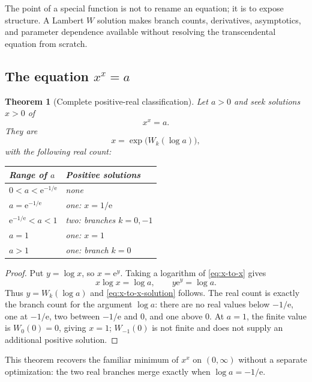 \documentclass[11pt]{article}
\numberwithin{equation}{section}
\newtheorem{theorem}{Theorem}[section]
\theoremstyle{definition}
\theoremstyle{remark}
\newcommand{\e}{\mathrm e}
\begin{document}
The point of a special function is not to rename an equation; it is to expose
structure.  A Lambert $W$ solution makes branch counts, derivatives,
asymptotics, and parameter dependence available without resolving the
transcendental equation from scratch.

\subsection{The equation \texorpdfstring{$x^x=a$}{x to the x = a}}

\begin{theorem}[Complete positive-real classification]
\label{thm:x-to-x}
Let $a>0$ and seek solutions $x>0$ of
\begin{equation}
  x^x=a.                                               \label{eq:x-to-x}
\end{equation}
They are
\begin{equation}
  x=\exp\bigl(W_k(\log a)\bigr),                      \label{eq:x-to-x-solution}
\end{equation}
with the following real count:
\begin{center}
\begin{tabular}{@{}ll@{}}
\toprule
Range of $a$ & Positive solutions \\
\midrule
$0<a<\e^{-1/\e}$ & none \\
$a=\e^{-1/\e}$ & one: $x=1/\e$ \\
$\e^{-1/\e}<a<1$ & two: branches $k=0,-1$ \\
$a=1$ & one: $x=1$ \\
$a>1$ & one: branch $k=0$ \\
\bottomrule
\end{tabular}
\end{center}
\end{theorem}

\begin{proof}
Put $y=\log x$, so $x=\e^y$.  Taking a logarithm of
\eqref{eq:x-to-x} gives
\[
  x\log x=\log a,
  \qquad
  y\e^y=\log a.
\]
Thus $y=W_k(\log a)$ and \eqref{eq:x-to-x-solution} follows.  The real count is
exactly the branch count for the argument $\log a$:
there are no real values below $-1/\e$, one at $-1/\e$, two between
$-1/\e$ and $0$, and one above $0$.  At $a=1$, the finite value is
$W_0(0)=0$, giving $x=1$; $W_{-1}(0)$ is not finite and does not supply an
additional positive solution.
\end{proof}

This theorem recovers the familiar minimum of $x^x$ on $(0,\infty)$ without a
separate optimization: the two real branches merge exactly when
$\log a=-1/\e$.
\end{document}

